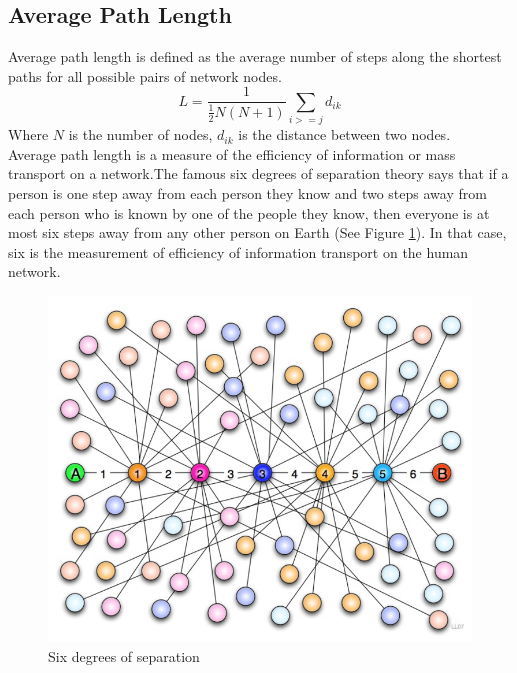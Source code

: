 \subsection{Average Path Length}
Average path length is defined as the average number of steps along the shortest paths for all possible pairs of network nodes\cite{www-apl}. 
\\
\begin{equation}
L=\frac{1}{\frac{1}{2}N(N+1)}\sum_{i>=j}d_{ik}
\end{equation}
Where $N$ is the number of nodes, $d_{ik}$ is the distance between two nodes.
\\
Average path length is a measure of the efficiency of information or mass transport on a network.The famous six degrees of separation theory\cite{www-sds} says that if a person is one step away from each person they know and two steps away from each person who is known by one of the people they know, then everyone is at most six steps away from any other person on Earth (See Figure \ref{F:six}). In that case, six is the measurement of efficiency of information transport on the human network.



\begin{figure}[ht!]
\includegraphics [totalheight=0.3\textheight]{images/six.png}
\caption {Six degrees of separation\cite{www-sds}}
\label {F:six}
\end{figure}



